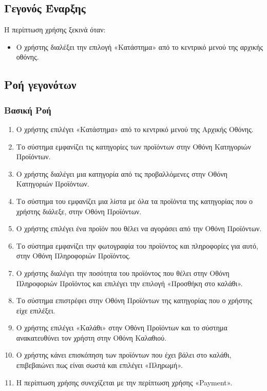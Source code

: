 \documentclass[12pt,a4paper,twoside]{book}
\begin{document}
\subsection{Γεγονός Έναρξης}
Η περίπτωση χρήσης ξεκινά όταν:
\begin{itemize}
  \item Ο χρήστης διαλέξει την επιλογή «Κατάστημα» από το κεντρικό μενού της αρχικής οθόνης. %
\end{itemize}

\subsection{Ροή γεγονότων}

\subsubsection{Βασική Ροή}
\begin{enumerate}
  \item Ο χρήστης επιλέγει «Κατάστημα» από το κεντρικό μενού της Αρχικής Οθόνης. %
  \item Το σύστημα εμφανίζει τις κατηγορίες των προϊόντων στην Οθόνη Κατηγοριών Προϊόντων. %
  \item Ο χρήστης διαλέγει μια κατηγορία από τις προβαλλόμενες στην Οθόνη Κατηγοριών Προϊόντων.  %
  \item Το σύστημα του εμφανίζει μια λίστα με όλα τα προϊόντα της κατηγορίας που ο χρήστης διάλεξε, στην Οθόνη Προϊόντων. %
  \item Ο χρήστης επιλέγει ένα προϊόν που θέλει να αγοράσει από την Οθόνη Προϊόντων. %
  \item Το σύστημα εμφανίζει την φωτογραφία του προϊόντος και πληροφορίες για αυτό, στην Οθόνη Πληροφοριών Προϊόντος.  %
  \item Ο χρήστης διαλέγει την ποσότητα του προϊόντος που θέλει στην Οθόνη Πληροφοριών Προϊόντος και επιλέγει την επιλογή «Προσθήκη στο καλάθι».  %
  \item Το σύστημα επιστρέφει στην Οθόνη Προϊόντων της κατηγορίας που ο χρήστης είχε επιλέξει. %
  \item Ο χρήστης επιλέγει «Καλάθι» στην Οθόνη Προϊόντων και το σύστημα ανακατευθύνει τον χρήστη στην Οθόνη Καλαθιού.
  \item Ο χρήστης κάνει επισκόπηση των προϊόντων που έχει βάλει στο καλάθι, επιβεβαιώνει πως είναι σωστά και επιλέγει «Πληρωμή».
  \item Η περίπτωση χρήσης συνεχίζεται με την περίπτωση χρήσης «Payment».
\end{enumerate}
\end{document}
